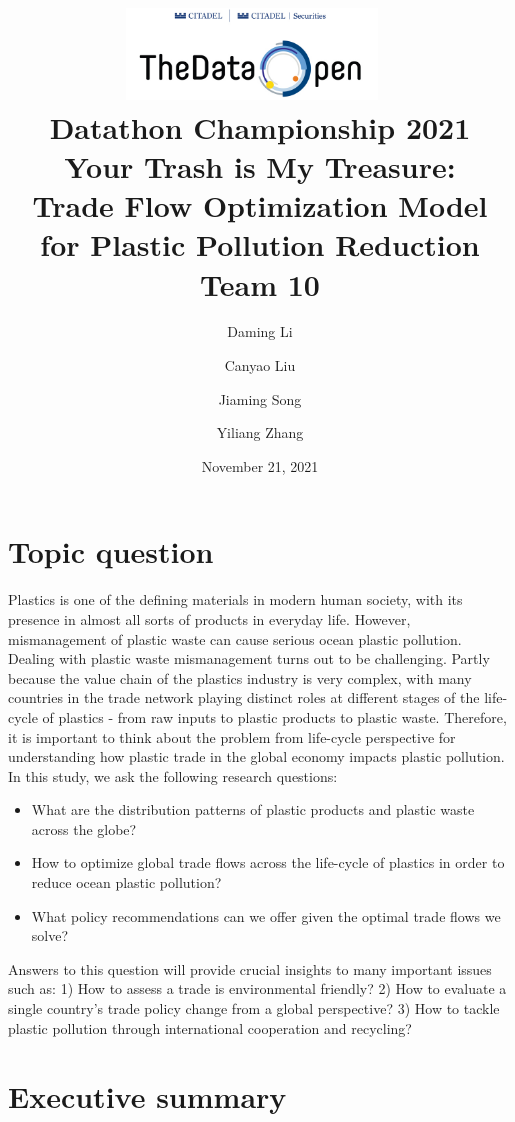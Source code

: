 \documentclass[dvipsnames]{article}
\title{%
\includegraphics[width=0.5\textwidth]{data-open-logo.jpg}~
\\[1cm]
Datathon Championship 2021 \\
\vspace{0.5em}
\textbf{Your Trash is My Treasure:} \\
\textbf{Trade Flow Optimization Model for Plastic Pollution Reduction} \\[0.5em]
\large Team 10}
\author[1]{Daming Li}
\author[2]{Canyao Liu}
\author[3]{Jiaming Song}
\author[4]{Yiliang Zhang}
\affil[1]{Department of Physics, Yale University}
\affil[2]{Yale School of Management}
\affil[3]{Department of Computer Science, Stanford University}
\affil[4]{Department of Biostatistics, Yale School of Public Health}
\date{November 21, 2021}
\newcommand{\dl}[1]{{\color{Plum}{{[DL: \bf #1]}}}}
\begin{document}
\maketitle
\thispagestyle{empty}
\section{Topic question}

Plastics is one of the defining materials in modern human society, with its presence in almost all sorts of products in everyday life. However, mismanagement of plastic waste can cause serious ocean plastic pollution. Dealing with plastic waste mismanagement turns out to be challenging. Partly because
the value chain of the plastics industry is very complex, with many countries in the trade network playing distinct roles at different stages of the life-cycle of plastics - from raw inputs to plastic products to plastic waste. Therefore, it is important to think about the problem from life-cycle perspective
for understanding how plastic trade in the global economy impacts plastic pollution. In this study, we ask the following research questions:

%
\begin{itemize}
    \item What are the distribution patterns of plastic products and plastic waste across the globe?
    \item How to optimize global trade flows across the life-cycle of plastics in order to reduce ocean plastic pollution?
    \item What policy recommendations can we offer given the optimal trade flows we solve?
\end{itemize}
%
Answers to this question will provide crucial insights to many important issues such as: 1) How to assess a trade is environmental friendly? 2) How to evaluate a single country's trade policy change from a global perspective? 3) How to tackle plastic pollution through international cooperation and recycling?



\pagebreak

\setcounter{page}{1}
\section{Executive summary}

\end{document}
